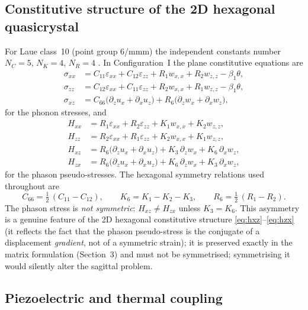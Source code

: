 \documentclass[11pt]{article}
\newcommand{\e}{\varepsilon}
\newcommand{\sig}{\sigma}
\newcommand{\tht}{\theta}
\begin{document}
\subsection{Constitutive structure of the 2D hexagonal quasicrystal}

For Laue class~10 (point group 6/mmm) the independent constants number $N_C=5$, $N_K=4$, $N_R=4$ \cite{yang2014,ding2000}. In Configuration~I the plane constitutive equations are
\begin{align}
\sig_{xx}&=C_{11}\e_{xx}+C_{12}\e_{zz}+R_1 w_{x,x}+R_2 w_{z,z}-\beta_1\tht, \label{eq:sxx}\\
\sig_{zz}&=C_{12}\e_{xx}+C_{11}\e_{zz}+R_2 w_{x,x}+R_1 w_{z,z}-\beta_1\tht, \label{eq:szz}\\
\sig_{xz}&=C_{66}\big(\partial_z u_x+\partial_x u_z\big)+R_6\big(\partial_z w_x+\partial_x w_z\big), \label{eq:sxz}
\end{align}
for the phonon stresses, and
\begin{align}
H_{xx}&=R_1\e_{xx}+R_2\e_{zz}+K_1 w_{x,x}+K_2 w_{z,z}, \label{eq:hxx}\\
H_{zz}&=R_2\e_{xx}+R_1\e_{zz}+K_2 w_{x,x}+K_1 w_{z,z}, \label{eq:hzz}\\
H_{xz}&=R_6\big(\partial_z u_x+\partial_x u_z\big)+K_3\,\partial_z w_x+K_6\,\partial_x w_z, \label{eq:hxz}\\
H_{zx}&=R_6\big(\partial_z u_x+\partial_x u_z\big)+K_6\,\partial_z w_x+K_3\,\partial_x w_z, \label{eq:hzx}
\end{align}
for the phason pseudo-stresses. The hexagonal symmetry relations used throughout \cite{yang2014,yang1994prb} are
\begin{equation}
C_{66}=\tfrac12\,(C_{11}-C_{12}),\qquad K_6=K_1-K_2-K_3,\qquad R_6=\tfrac12\,(R_1-R_2). \label{eq:symrels}
\end{equation}
The phason stress is \emph{not symmetric}: $H_{xz}\neq H_{zx}$ unless $K_3=K_6$. This asymmetry is a genuine feature of the 2D hexagonal constitutive structure \eqref{eq:hxz}--\eqref{eq:hzx} (it reflects the fact that the phason pseudo-stress is the conjugate of a displacement \emph{gradient}, not of a symmetric strain); it is preserved exactly in the matrix formulation (Section~3) and must not be symmetrised; symmetrising it would silently alter the sagittal problem.

\subsection{Piezoelectric and thermal coupling}
\end{document}

